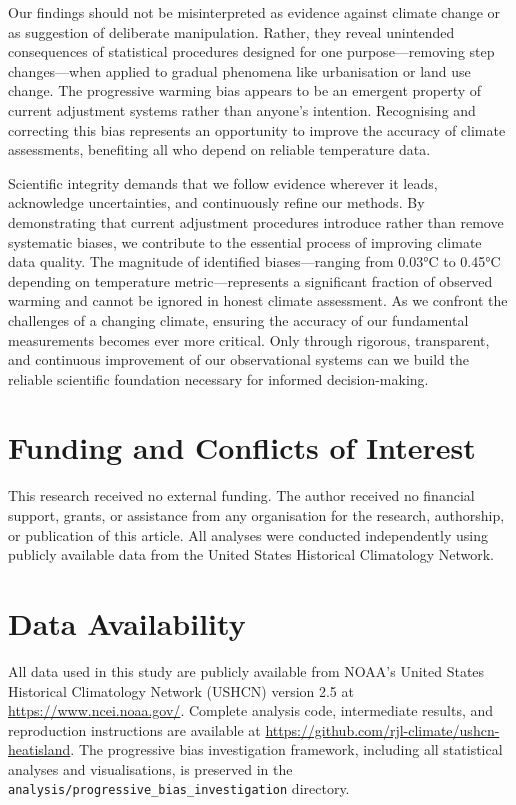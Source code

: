 \documentclass[11pt, a4paper]{article}
\begin{document}
Our findings should not be misinterpreted as evidence against climate change or as suggestion of deliberate manipulation. Rather, they reveal unintended consequences of statistical procedures designed for one purpose—removing step changes—when applied to gradual phenomena like urbanisation or land use change. The progressive warming bias appears to be an emergent property of current adjustment systems rather than anyone's intention. Recognising and correcting this bias represents an opportunity to improve the accuracy of climate assessments, benefiting all who depend on reliable temperature data.

Scientific integrity demands that we follow evidence wherever it leads, acknowledge uncertainties, and continuously refine our methods. By demonstrating that current adjustment procedures introduce rather than remove systematic biases, we contribute to the essential process of improving climate data quality. The magnitude of identified biases—ranging from 0.03°C to 0.45°C depending on temperature metric—represents a significant fraction of observed warming and cannot be ignored in honest climate assessment. As we confront the challenges of a changing climate, ensuring the accuracy of our fundamental measurements becomes ever more critical. Only through rigorous, transparent, and continuous improvement of our observational systems can we build the reliable scientific foundation necessary for informed decision-making.

\section*{Funding and Conflicts of Interest}

This research received no external funding. The author received no financial support, grants, or assistance from any organisation for the research, authorship, or publication of this article. All analyses were conducted independently using publicly available data from the United States Historical Climatology Network.

\section*{Data Availability}

All data used in this study are publicly available from NOAA's United States Historical Climatology Network (USHCN) version 2.5 at \url{https://www.ncei.noaa.gov/}. Complete analysis code, intermediate results, and reproduction instructions are available at \url{https://github.com/rjl-climate/ushcn-heatisland}. The progressive bias investigation framework, including all statistical analyses and visualisations, is preserved in the \texttt{analysis/progressive\_bias\_investigation} directory.

\printbibliography[title={References}] %
\end{document}
